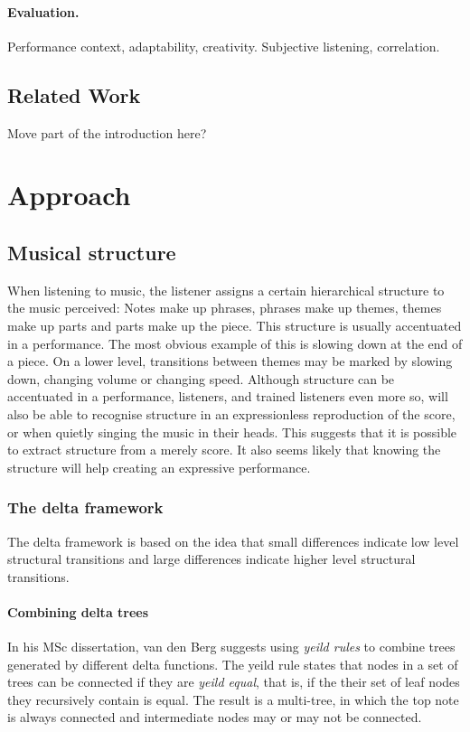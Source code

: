 \documentclass[a4paper,10pt]{article}
\begin{document}
\paragraph*{Evaluation.} Performance context, adaptability, creativity. Subjective listening, correlation.

\subsection{Related Work}
Move part of the introduction here?

\section{Approach}

\subsection{Musical structure}
When listening to music, the listener assigns a certain hierarchical structure to the music perceived: Notes make up phrases, phrases make up themes, themes make up parts and parts make up the piece. This structure is usually accentuated in a performance. The most obvious example of this is slowing down at the end of a piece. On a lower level, transitions between themes may be marked by slowing down, changing volume or changing speed. Although structure can be accentuated in a performance, listeners, and trained listeners even more so, will also be able to recognise structure in an expressionless reproduction of the score, or when quietly singing the music in their heads. This suggests that it is possible to extract structure from a merely score. It also seems likely that knowing the structure will help creating an expressive performance.

\subsubsection*{The delta framework}

The delta framework is based on the idea that small differences indicate low level structural transitions and large differences indicate higher level structural transitions. 

\paragraph*{Combining delta trees} 

In his MSc dissertation, van den Berg suggests using \textit{yeild rules} to combine trees generated by different delta functions. The yeild rule states that nodes in a set of trees can be connected if they are \textit{yeild equal}, that is, if the their set of leaf nodes they recursively contain is equal. The result is a multi-tree, in which the top note is always connected and intermediate nodes may or may not be connected. 
\end{document}
